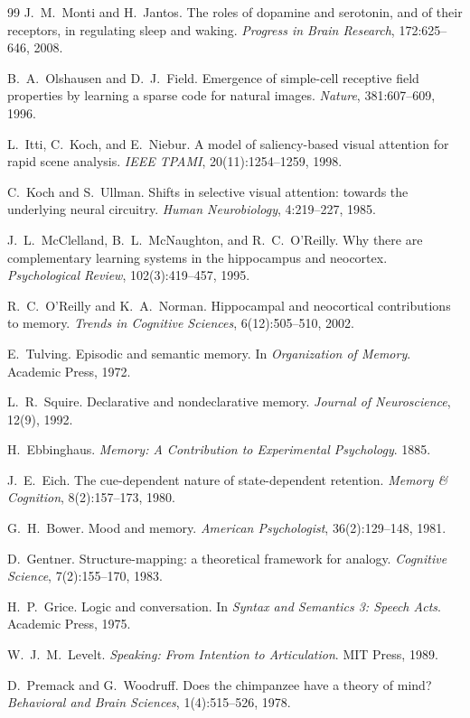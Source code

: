 \documentclass[11pt]{article}
\begin{document}
\begin{thebibliography}{99}
 J.~M.~Monti and H.~Jantos. The roles of dopamine and
serotonin, and of their receptors, in regulating sleep and waking.
\emph{Progress in Brain Research}, 172:625--646, 2008.

 B.~A.~Olshausen and D.~J.~Field. Emergence of
simple-cell receptive field properties by learning a sparse code for
natural images. \emph{Nature}, 381:607--609, 1996.

 L.~Itti, C.~Koch, and E.~Niebur. A model of
saliency-based visual attention for rapid scene analysis. \emph{IEEE
TPAMI}, 20(11):1254--1259, 1998.

 C.~Koch and S.~Ullman. Shifts in selective visual
attention: towards the underlying neural circuitry. \emph{Human
Neurobiology}, 4:219--227, 1985.

 J.~L.~McClelland, B.~L.~McNaughton, and
R.~C.~O'Reilly. Why there are complementary learning systems in the
hippocampus and neocortex. \emph{Psychological Review},
102(3):419--457, 1995.

 R.~C.~O'Reilly and K.~A.~Norman. Hippocampal and
neocortical contributions to memory. \emph{Trends in Cognitive
Sciences}, 6(12):505--510, 2002.

 E.~Tulving. Episodic and semantic memory. In
\emph{Organization of Memory}. Academic Press, 1972.

 L.~R.~Squire. Declarative and nondeclarative memory.
\emph{Journal of Neuroscience}, 12(9), 1992.

 H.~Ebbinghaus. \emph{Memory: A Contribution to
Experimental Psychology}. 1885.

 J.~E.~Eich. The cue-dependent nature of state-dependent
retention. \emph{Memory \& Cognition}, 8(2):157--173, 1980.

 G.~H.~Bower. Mood and memory. \emph{American
Psychologist}, 36(2):129--148, 1981.

 D.~Gentner. Structure-mapping: a theoretical
framework for analogy. \emph{Cognitive Science}, 7(2):155--170, 1983.

 H.~P.~Grice. Logic and conversation. In
\emph{Syntax and Semantics 3: Speech Acts}. Academic Press, 1975.

 W.~J.~M.~Levelt. \emph{Speaking: From Intention to
Articulation}. MIT Press, 1989.

 D.~Premack and G.~Woodruff. Does the chimpanzee have
a theory of mind? \emph{Behavioral and Brain Sciences}, 1(4):515--526,
1978.


\end{thebibliography}
\end{document}
